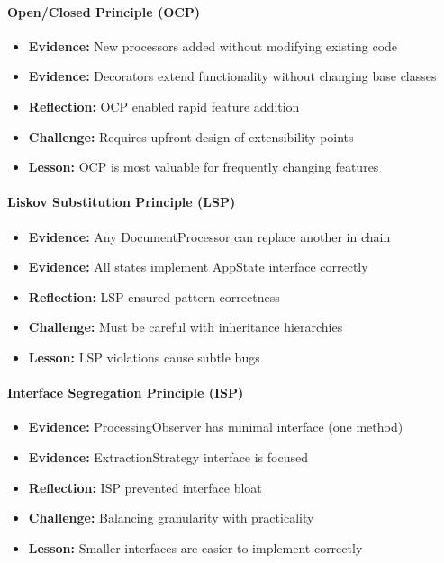 \documentclass[11pt, a4paper]{article}
\theoremstyle{plain}
\theoremstyle{definition}
\begin{document}
\paragraph{Open/Closed Principle (OCP)}
\begin{itemize}
    \item \textbf{Evidence:} New processors added without modifying existing code
    \item \textbf{Evidence:} Decorators extend functionality without changing base classes
    \item \textbf{Reflection:} OCP enabled rapid feature addition
    \item \textbf{Challenge:} Requires upfront design of extensibility points
    \item \textbf{Lesson:} OCP is most valuable for frequently changing features
\end{itemize}

\paragraph{Liskov Substitution Principle (LSP)}
\begin{itemize}
    \item \textbf{Evidence:} Any DocumentProcessor can replace another in chain
    \item \textbf{Evidence:} All states implement AppState interface correctly
    \item \textbf{Reflection:} LSP ensured pattern correctness
    \item \textbf{Challenge:} Must be careful with inheritance hierarchies
    \item \textbf{Lesson:} LSP violations cause subtle bugs
\end{itemize}

\paragraph{Interface Segregation Principle (ISP)}
\begin{itemize}
    \item \textbf{Evidence:} ProcessingObserver has minimal interface (one method)
    \item \textbf{Evidence:} ExtractionStrategy interface is focused
    \item \textbf{Reflection:} ISP prevented interface bloat
    \item \textbf{Challenge:} Balancing granularity with practicality
    \item \textbf{Lesson:} Smaller interfaces are easier to implement correctly
\end{itemize}
\end{document}
